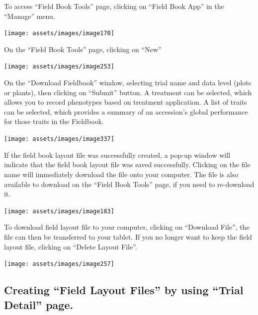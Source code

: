 \documentclass[
  12pt,
]{book}
\begin{document}
To access ``Field Book Tools'' page, clicking on ``Field Book App'' in the ``Manage'' menu.

\begin{center}\texttt{[image: assets/images/image170]} \end{center}

On the ``Field Book Tools'' page, clicking on ``New''

\begin{center}\texttt{[image: assets/images/image253]} \end{center}

On the ``Download Fieldbook'' window, selecting trial name and data level (plots or plants), then clicking on ``Submit'' button. A treatment can be selected, which allows you to record phenotypes based on treatment application. A list of traits can be selected, which provides a summary of an accession's global performance for those traits in the Fieldbook.

\begin{center}\texttt{[image: assets/images/image337]} \end{center}

If the field book layout file was successfully created, a pop-up window will indicate that the field book layout file was saved successfully. Clicking on the file name will immediately download the file onto your computer. The file is also available to download on the ``Field Book Tools'' page, if you need to re-download it.

\begin{center}\texttt{[image: assets/images/image183]} \end{center}

To download field layout file to your computer, clicking on ``Download File'', the file can then be transferred to your tablet. If you no longer want to keep the field layout file, clicking on ``Delete Layout File''.

\begin{center}\texttt{[image: assets/images/image257]} \end{center}

\hypertarget{creating-field-layout-files-by-using-trial-detail-page.}{%
\subsection{Creating ``Field Layout Files'' by using ``Trial Detail'' page.}\label{creating-field-layout-files-by-using-trial-detail-page.}}
\end{document}
